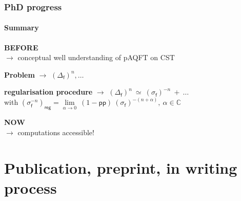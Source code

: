 \documentclass[9pt]{beamer}
\newcommand{\pp}{\mathsf{pp}} %
\newcommand{\Cbb}{\mathbb{C}}
\newcommand{\fsf}{\mathsf{f}}
\begin{document}

\begin{frame}

\frametitle{PhD progress}
\framesubtitle{Summary}

\begin{exampleblock}{\vspace*{-3ex}}
\centering \textbf{BEFORE} \\ $\to$ conceptual well understanding of pAQFT on CST  
\end{exampleblock}
%
\vspace*{-8pt}
%
\begin{exampleblock}{\vspace*{-3ex}}
\centering \textbf{Problem} $\to$ $(\Delta_\fsf)^n, \dots $
\end{exampleblock}
%
\vspace*{-8pt}
%
\begin{exampleblock}{\vspace*{-3ex}}
\centering \textbf{regularisation procedure} $\to$ $(\Delta_\fsf)^{n} \ \simeq \ (\sigma_\fsf)^{-n} \ + \ \dots$ \\
with $(\sigma_\fsf^{-n})_{\mathsf{reg}} = \underset{\alpha \to 0}{\lim} \ (1-\pp) \ (\sigma_\fsf)^{-(n+\alpha)}, \ \alpha \in \Cbb$
\end{exampleblock}
%
\vspace*{-8pt}
%
\begin{exampleblock}{\vspace*{-3ex}}
\centering \textbf{NOW} \\ $\to$ computations accessible!
\end{exampleblock}
    
\end{frame} 

\section[Publi.]{Publication, preprint, in writing process}
\end{document}
